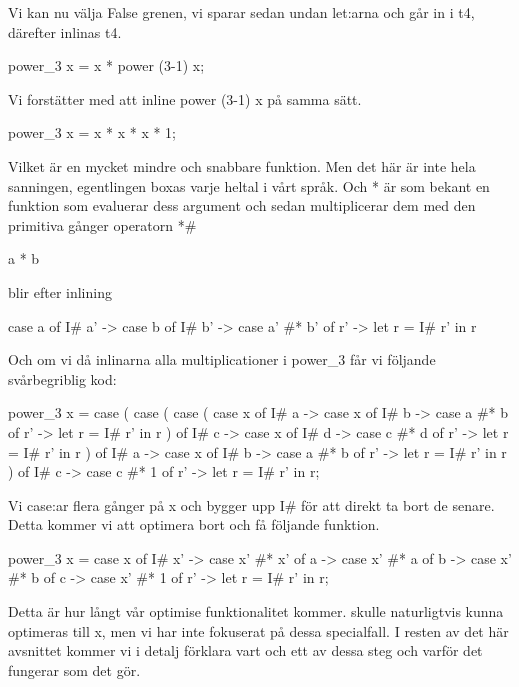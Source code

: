 \documentclass[../Optimise]{subfiles}
\begin{document}
Vi kan nu välja False grenen, vi sparar sedan undan let:arna och går in i t4, därefter inlinas t4.

\begin{codeEx}
power_3 x = x * power (3-1) x;
\end{codeEx}

Vi forstätter med att inline power (3-1) x på samma sätt.

\begin{codeEx}
power_3 x = x * x * x * 1;
\end{codeEx}

Vilket är en mycket mindre och snabbare funktion.
Men det här är inte hela sanningen, egentlingen boxas varje heltal i vårt språk.
 Och * är som bekant en funktion som evaluerar dess argument och sedan multiplicerar
dem med den primitiva gånger operatorn *\#

\begin{codeEx}
a * b
\end{codeEx}

blir efter inlining

\begin{codeEx}
case a of
    { I# a' -> case b of
        { I# b' -> case  a' #* b' of
            { r' -> let r = I# r' in r}}}
\end{codeEx}

Och om vi då inlinarna alla multiplicationer i power\_3 får vi följande svårbegriblig kod:
\begin{codeEx}
power_3 x = case 
    ( case 
        ( case 
            ( case x of
                { I# a -> case x of
                    { I# b -> case a #* b of
                        { r' -> let r = I# r' in r}}}
            ) of
            { I# c -> case x of
                { I# d -> case c #* d of
                    { r' -> let r = I# r' in r}}}                
         ) of
         { I# a -> case x of
              { I# b -> case a #* b of
                   { r' -> let r = I# r' in r}}}
    ) of
        { I# c -> case c #* 1 of
            { r' -> let r = I# r' in r}};                                     
\end{codeEx}


Vi case:ar flera gånger på x och bygger upp I\# för att direkt ta bort de senare.
 Detta kommer vi att optimera bort och få följande funktion.

\begin{codeEx}
power_3 x = case x of
    { I# x' -> case x' #* x' of
        { a -> case x' #* a of
            { b -> case x' #* b of
                { c -> case x' #* 1 of
                    { r' -> let r = I# r' in r}}}}};
\end{codeEx}

Detta är hur långt vår optimise funktionalitet kommer.  skulle naturligtvis
kunna optimeras till x, men vi har inte fokuserat på dessa specialfall.
I resten av det här avsnittet kommer vi i detalj förklara vart och ett av dessa 
steg och varför det fungerar som det gör.
\end{document}
